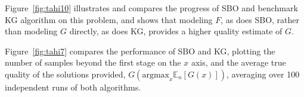 \documentclass{article} %
\newcommand{\w}{w}
\newcommand{\z}{z}
\newcommand{\pfcomment}[1]{{\color{red} PF: #1}}
\begin{document}
Figure~\ref{fig:tahi10} illustrates and compares the progress of SBO and benchmark KG algorithm on this problem, and shows that modeling $F$, as does SBO, rather than modeling $G$ directly, as does KG, provides a higher quality estimate of $G$.

Figure~\ref{fig:tahi7} compares the performance of SBO and KG, plotting the number of samples beyond the first stage on the $x$ axis, and the average true quality of the solutions provided, $G(\mathrm{argmax}_x \mathbb{E}_n[G(x)])$, averaging over 100 independent runs of both algorithms.



\[
\]
\end{document}
